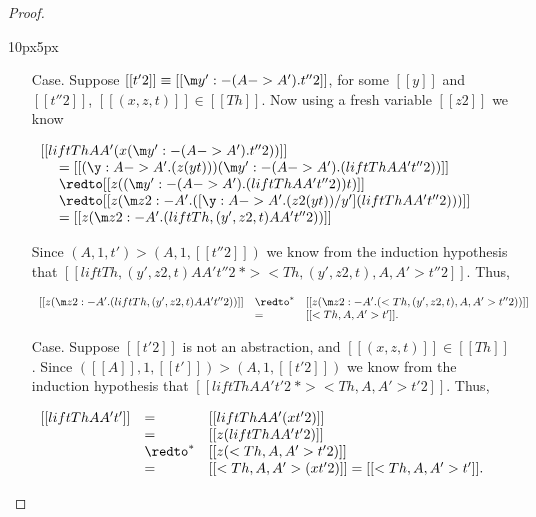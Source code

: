 \begin{proof}
\begin{changemargin}{10px}{5px}
\begin{itemize}
\begin{itemize}
\begin{itemize}
      \item[Case.] Suppose $[[t'2]] \equiv [[\m y':{-(A->A')}.t''2]]$, for some $[[y]]$ and 
        $[[t''2]]$, $[[(x,z,t)]] \in [[Th]]$. 
        Now using a fresh variable $[[z2]]$ we know 
        \begin{center}
          \small
          \begin{math}
            \begin{array}{lll}
              [[lift Th A A' (x (\m y':{-(A->A')}.t''2))]] \\
              \ \ \ \ = [[(\y:A->A'.(z (y t))) (\m y':{-(A->A')}.(lift Th A A' t''2))]]\\ 
              \ \ \ \ \redto [[z ((\m y':{-(A->A')}.(lift Th A A' t''2)) t)]] \\
              \ \ \ \ \redto [[z (\m z2:{-A'}.([\y:A->A'.(z2 (y t))/y'](lift Th A A' t''2)))]] \\
              \ \ \ \ = [[z (\m z2:{-A'}.(lift Th,(y',z2,t) A A' t''2))]]\\
            \end{array}
          \end{math}
        \end{center}
        Since $(A,1,t') > (A,1,[[t''2]])$ we know from the 
        induction hypothesis that $[[lift Th,(y',z2,t) A A' t''2 ~*> <Th,(y',z2,t),A,A'>t''2]]$.
        Thus, 
        \begin{center}
          \small
          \begin{math}
            \begin{array}{lll}
              [[z (\m z2:{-A'}.(lift Th,(y',z2,t) A A' t''2))]] & \redto^* & [[z (\m z2:{-A'}.(<Th,(y',z2,t),A,A'>t''2))]]\\
              & = & [[<Th,A,A'>t']].
            \end{array}
          \end{math}
        \end{center}
        
      \item[Case.] Suppose $[[t'2]]$ is not an abstraction, and $[[(x,z,t)]] \in [[Th]]$. 
        Since $([[A]],1,[[t']]) > (A,1,[[t'2]])$ we know from the 
        induction hypothesis that $[[lift Th A A' t'2 ~*> <Th,A,A'>t'2]]$.  Thus,
        \begin{center}
          \begin{math}
            \begin{array}{lll}
              [[lift Th A A' t']] & = & [[lift Th A A' (x t'2)]]\\ 
              & = & [[z (lift Th A A' t'2)]]\\ 
              & \redto^* & [[z (<Th,A,A'>t'2)]]\\
              & = & [[<Th,A,A'> (x t'2)]] = [[<Th,A,A'>t']].
            \end{array}
          \end{math}
        \end{center}


\end{itemize}
\end{itemize}
\end{itemize}
\end{changemargin}
\end{proof}
